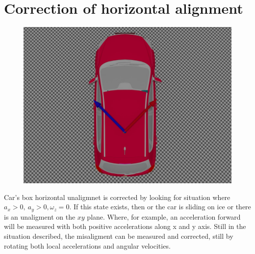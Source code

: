 \section{Correction of horizontal alignment}
\begin{figure}[H]
\includegraphics[width=\textwidth]{kia_bad_xy_align.jpg}
\end{figure}
Car's box horizontal unaligmnet is corrected by looking for situation where $a_x>0, \ a_y>0, \omega_z =0$. If this state exists, then or the car is sliding on ice or there is an unaligment on the $xy$ plane. Where, for example, an acceleration forward will be measured with both positive accelerations along x and y axis. 
Still in the situation described, the misaligment can be measured and corrected, still by rotating both local accelerations and angular velocities.

